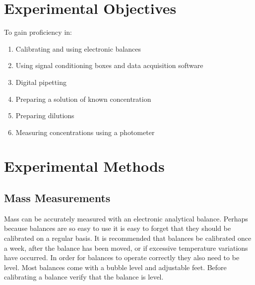 \documentclass[letterpaper,10pt,english]{sphinxmanual}
\begin{document}
\section{Experimental Objectives}
\label{\detokenize{Laboratory_Measurements/Laboratory_Measurements:experimental-objectives}}\label{\detokenize{Laboratory_Measurements/Laboratory_Measurements:heading-laboratory-measurements-and-procedures-experimental-objectives}}
To gain proficiency in:
\begin{enumerate}
\item {} 
Calibrating and using electronic balances

\item {} 
Using signal conditioning boxes and data acquisition software

\item {} 
Digital pipetting

\item {} 
Preparing a solution of known concentration

\item {} 
Preparing dilutions

\item {} 
Measuring concentrations using a photometer

\end{enumerate}


\section{Experimental Methods}
\label{\detokenize{Laboratory_Measurements/Laboratory_Measurements:experimental-methods}}\label{\detokenize{Laboratory_Measurements/Laboratory_Measurements:heading-laboratory-measurements-and-procedures-experimental-methods}}

\subsection{Mass Measurements}
\label{\detokenize{Laboratory_Measurements/Laboratory_Measurements:mass-measurements}}
Mass can be accurately measured with an electronic analytical balance. Perhaps because balances are so easy to use it is easy to forget that they should be calibrated on a regular basis. It is recommended that balances be calibrated once a week, after the balance has been moved, or if excessive temperature variations have occurred. In order for balances to operate correctly they also need to be level. Most balances come with a bubble level and adjustable feet. Before calibrating a balance verify that the balance is level.
\end{document}
